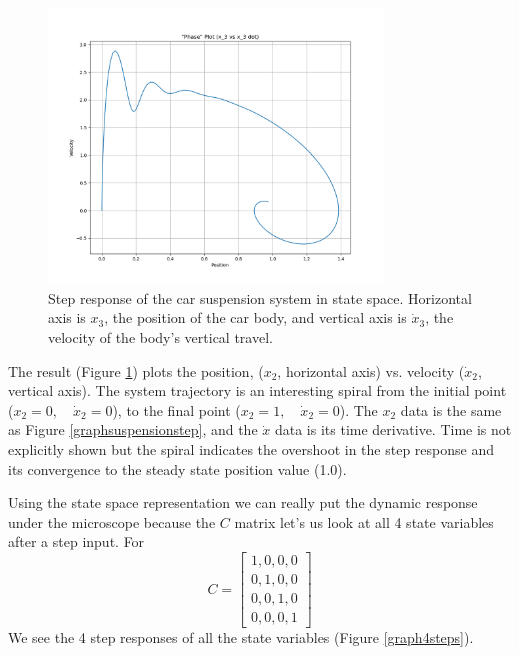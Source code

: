 \begin{figure}\centering
\includegraphics[width=3.5in]{figs04/py_phase_plot.png}
\caption{Step response of the car suspension system in state space.  Horizontal axis is $x_3$, the position of the car body, and vertical axis is $\dot{x}_3$, the velocity of the body's vertical travel.}\label{graphstatespacespiral}
\end{figure}

The result (Figure \ref{graphstatespacespiral}) plots the position, ($x_2$, horizontal axis) vs. velocity ($\dot{x}_2$, vertical axis).  The system trajectory is an interesting spiral from the initial point
($x_2=0, \quad \dot{x}_2=0$), to the final point ($x_2=1, \quad\dot{x}_2=0$).
The $x_2$ data is the same
as Figure \ref{graphsuspensionstep}, and the $\dot{x}$ data is its time derivative.
Time is not explicitly shown but the spiral indicates the overshoot in the step
response and its convergence to the steady state position value (1.0).

Using the state space representation we can really put the dynamic response under the microscope because the $C$ matrix let's us look at all 4 state variables after a step
input. For
\[ C = \begin{bmatrix} 1,0,0,0 \\ 0,1,0,0 \\ 0,0,1,0 \\ 0,0,0,1\end{bmatrix}
 \]
 We see the 4 step responses of all the state variables (Figure \ref{graph4steps}).

